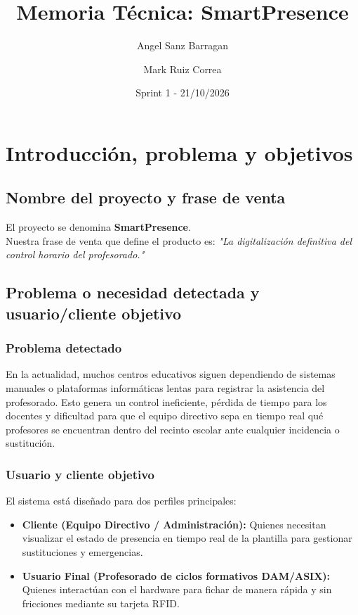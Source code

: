 \documentclass[12pt, a4paper]{report}
\title{\textbf{Memoria Técnica: SmartPresence}}
\author{Angel Sanz Barragan \and Mark Ruiz Correa}
\date{Sprint 1 - 21/10/2026}
\begin{document}
\maketitle
\tableofcontents
\newpage

\chapter{Introducción, problema y objetivos}

\section{Nombre del proyecto y frase de venta}
El proyecto se denomina \textbf{SmartPresence}. \\
Nuestra frase de venta que define el producto es: \textit{"La digitalización definitiva del control horario del profesorado."}

\section{Problema o necesidad detectada y usuario/cliente objetivo}
\subsection{Problema detectado}
En la actualidad, muchos centros educativos siguen dependiendo de sistemas manuales o plataformas informáticas lentas para registrar la asistencia del profesorado. Esto genera un control ineficiente, pérdida de tiempo para los docentes y dificultad para que el equipo directivo sepa en tiempo real qué profesores se encuentran dentro del recinto escolar ante cualquier incidencia o sustitución.

\subsection{Usuario y cliente objetivo}
El sistema está diseñado para dos perfiles principales:
\begin{itemize}
    \item \textbf{Cliente (Equipo Directivo / Administración):} Quienes necesitan visualizar el estado de presencia en tiempo real de la plantilla para gestionar sustituciones y emergencias.
    \item \textbf{Usuario Final (Profesorado de ciclos formativos DAM/ASIX):} Quienes interactúan con el hardware para fichar de manera rápida y sin fricciones mediante su tarjeta RFID.
\end{itemize}
\end{document}
